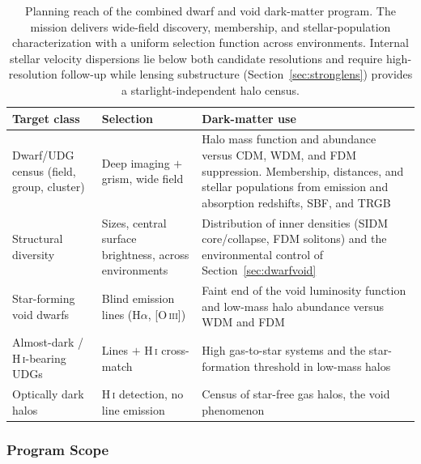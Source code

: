 \begin{table}[htbp]
\centering
\sffamily\small
\begin{tabularx}{\textwidth}{@{}p{3.4cm}p{3.6cm}X@{}}
\toprule
\textbf{Target class} & \textbf{Selection} & \textbf{Dark-matter use}\\
\midrule
Dwarf/UDG census (field, group, cluster) & Deep imaging $+$ grism, wide field & Halo mass function and abundance versus CDM, WDM, and FDM suppression. Membership, distances, and stellar populations from emission and absorption redshifts, SBF, and TRGB\\
Structural diversity & Sizes, central surface brightness, across environments & Distribution of inner densities (SIDM core/collapse, FDM solitons) and the environmental control of Section~\ref{sec:dwarfvoid}\\
Star-forming void dwarfs & Blind emission lines (H$\alpha$, [O\,\textsc{iii}]) & Faint end of the void luminosity function and low-mass halo abundance versus WDM and FDM\\
Almost-dark / H\,\textsc{i}-bearing UDGs & Lines $+$ H\,\textsc{i} cross-match & High gas-to-star systems and the star-formation threshold in low-mass halos\\
Optically dark halos & H\,\textsc{i} detection, no line emission & Census of star-free gas halos, the void phenomenon\\
\bottomrule
\end{tabularx}
\caption{Planning reach of the combined dwarf and void dark-matter program. The mission delivers wide-field discovery, membership, and stellar-population characterization with a uniform selection function across environments. Internal stellar velocity dispersions lie below both candidate resolutions and require high-resolution follow-up while lensing substructure (Section~\ref{sec:stronglens}) provides a starlight-independent halo census.}
\label{tab:dwarfvoidreach}
\end{table}

\subsubsection{Program Scope}

